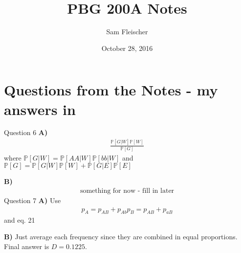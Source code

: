 \documentclass{article}
\title{PBG 200A Notes}
\author{Sam Fleischer}
\date{October 28, 2016}
\newcommand{\prob}{\mathbb{P}}
\begin{document}
    \maketitle

    \section{Questions from the Notes - my answers in {\color{magenta}}}
        Question 6
        \textbf{A)}
        {\color{magenta}
        \begin{align}
            \frac{\prob[G|W]\prob[W]}{\prob[G]}
        \end{align}
        where $\prob[G|W] = \prob[AA|W]\prob[bb|W]$ and $\prob[G] = \prob[G|W]\prob[W] + \prob[G|E]\prob[E]$
        }

        \textbf{B)}
        {\color{magenta}
        \begin{align}
            \text{something for now - fill in later}
        \end{align}
        }
        Question 7
        \textbf{A)}
        {\color{magenta}
        Use
        \begin{align}
            p_A = p_{AB} + p_{Ab}
            p_B = p_{AB} + p_{aB}
        \end{align}
        and eq. 21
        }

        \textbf{B)}
        {\color{magenta}
        Just average each frequency since they are combined in equal proportions.  Final answer is $D = 0.1225$.
        }
\end{document}
